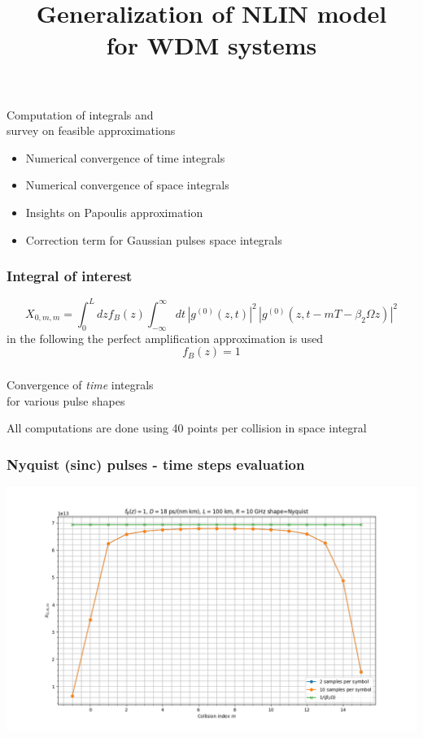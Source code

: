 \documentclass[8pt]{beamer} %
\title{\Huge{Generalization of NLIN model\\ for WDM systems}}
\date{}
\begin{document}
\begin{frame}
  \maketitle
\end{frame}

\begin{frame}
  \frametitle{}
  \Huge{Computation of integrals and \\survey on feasible approximations}
  \vspace{30pt}
  \normalsize{
  \begin{itemize}
  	\item Numerical convergence of time integrals
  	\item Numerical convergence of space integrals
  	\item Insights on Papoulis approximation
  	\item Correction term for Gaussian pulses space integrals
  \end{itemize}

}
\end{frame}

\begin{frame}
  \frametitle{Integral of interest}
	\begin{equation}
		X_{0, m, m} = \int_{0}^{L} dz f_B(z) \int_{-\infty}^{\infty} dt\, |g^{(0)}(z, t)|^2 \,|g^{(0)}(z, t-mT -\beta_2 \Omega z)|^2
	\end{equation}
	in the following the perfect amplification approximation is used
	\begin{equation}
		f_B(z) = 1
	\end{equation}
\end{frame}

\begin{frame}
	\frametitle{}
	\huge{Convergence of \textit{time} integrals \\for various pulse shapes}
	\vspace{30pt}
	
	\normalsize{All computations are done using 40 points per collision in space integral}
\end{frame}

\begin{frame}
	
	\frametitle{Nyquist (sinc) pulses - time steps evaluation}
	\includegraphics[width=\textwidth]{"./images/sim/Nyquist_time.png"}
\end{frame}
\end{document}

